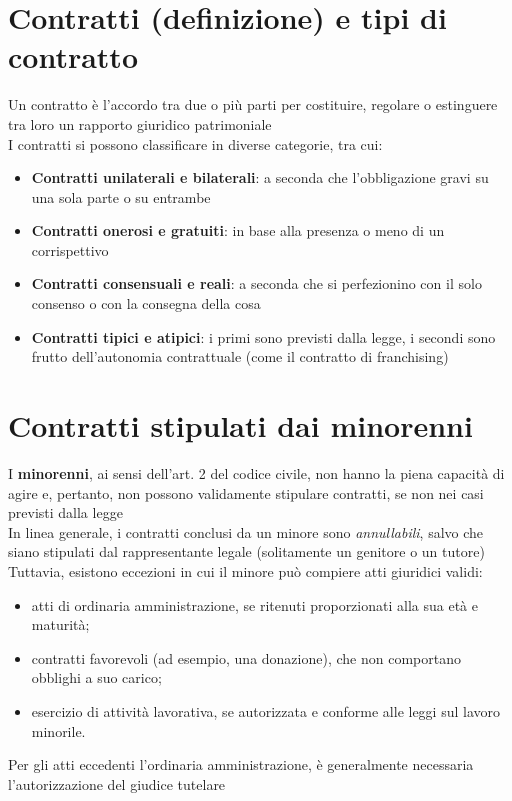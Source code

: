 \documentclass[8pt,oneside,a4paper]{article}
\begin{document}
	\section{Contratti (definizione) e tipi di contratto}
	Un contratto è l'accordo tra due o più parti per costituire, regolare o estinguere tra loro un rapporto giuridico patrimoniale\\
	I contratti si possono classificare in diverse categorie, tra cui:
	\begin{itemize}
		\item \textbf{Contratti unilaterali e bilaterali}: a seconda che l'obbligazione gravi su una sola parte o su entrambe
		\item \textbf{Contratti onerosi e gratuiti}: in base alla presenza o meno di un corrispettivo
		\item \textbf{Contratti consensuali e reali}: a seconda che si perfezionino con il solo consenso o con la consegna della cosa
		\item \textbf{Contratti tipici e atipici}: i primi sono previsti dalla legge, i secondi sono frutto dell'autonomia contrattuale (come il contratto di franchising)
	\end{itemize}
	\section{Contratti stipulati dai minorenni}
	I \textbf{minorenni}, ai sensi dell'art. 2 del codice civile, non hanno la piena capacità di agire e, pertanto, non possono validamente stipulare contratti, se non nei casi previsti dalla legge\\
	In linea generale, i contratti conclusi da un minore sono \textit{annullabili}, salvo che siano stipulati dal rappresentante legale (solitamente un genitore o un tutore)\\
	Tuttavia, esistono eccezioni in cui il minore può compiere atti giuridici validi:
	\begin{itemize}
		\item atti di ordinaria amministrazione, se ritenuti proporzionati alla sua età e maturità;
		\item contratti favorevoli (ad esempio, una donazione), che non comportano obblighi a suo carico;
		\item esercizio di attività lavorativa, se autorizzata e conforme alle leggi sul lavoro minorile.
	\end{itemize}
	Per gli atti eccedenti l’ordinaria amministrazione, è generalmente necessaria l’autorizzazione del giudice tutelare
\end{document}
